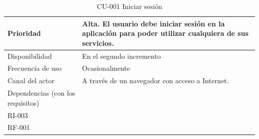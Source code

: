 \begin{table}[htpb]
\begin{tabularx}{\textwidth}{|l|X|}
Prioridad                         & Alta. El usuario debe iniciar sesión en la aplicación para poder utilizar cualquiera de sus servicios.                                                                                                                                             \\ \hline
Disponibilidad                    & En el segundo incremento                                                                                                                                                                                                                         \\ \hline
Frecuencia de uso                 & Ocasionalmente                                                                                                                                                                                                                                   \\ \hline
Canal del actor                   & A través de un navegador con acceso a Internet.                                                                                                                                                                                                  \\ \hline
Dependencias (con los requisitos) & \begin{tabular}[c]{@{}l@{}}RI-001\\ RI-003\\ RF-001\end{tabular}                                                                                                                                                                                 \\ \hline
\end{tabularx}
\caption{CU-001 Iniciar sesión}
\end{table}


